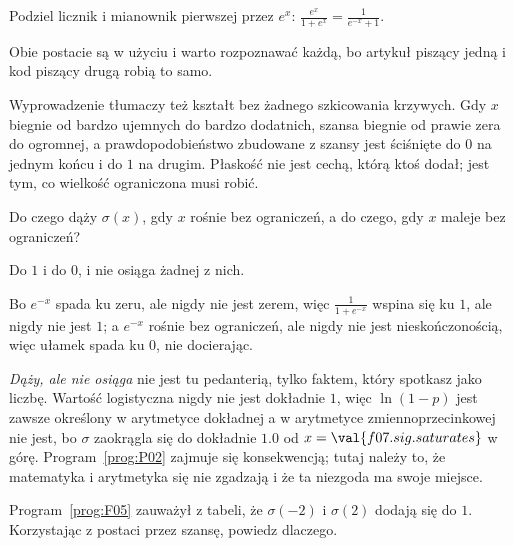 \begin{fr}
\begin{ansblock}
Podziel licznik i mianownik pierwszej przez $e^{x}$:
$\frac{e^{x}}{1 + e^{x}} = \frac{1}{e^{-x} + 1}$.
\end{ansblock}

Obie postacie są w użyciu i warto rozpoznawać każdą, bo artykuł piszący jedną
i kod piszący drugą robią to samo.

Wyprowadzenie tłumaczy też kształt bez żadnego szkicowania krzywych. Gdy $x$
biegnie od bardzo ujemnych do bardzo dodatnich, szansa biegnie od prawie zera
do ogromnej, a prawdopodobieństwo zbudowane z szansy jest ściśnięte do $0$ na
jednym końcu i do $1$ na drugim. Płaskość nie jest cechą, którą ktoś dodał;
jest tym, co wielkość ograniczona musi robić.

Do czego dąży $\sigma(x)$, gdy $x$ rośnie bez ograniczeń, a do czego, gdy $x$
maleje bez ograniczeń?
\nextframe
\end{fr}

\begin{fr}
\begin{ansblock}
Do $1$ i do $0$, i nie osiąga żadnej z nich.
\end{ansblock}

Bo $e^{-x}$ spada ku zeru, ale nigdy nie jest zerem, więc
$\frac{1}{1+e^{-x}}$ wspina się ku $1$, ale nigdy nie jest $1$; a $e^{-x}$
rośnie bez ograniczeń, ale nigdy nie jest nieskończonością, więc ułamek spada
ku $0$, nie docierając.

\begin{note}
\emph{Dąży, ale nie osiąga} nie jest tu pedanterią, tylko faktem, który
spotkasz jako liczbę. Wartość logistyczna nigdy nie jest dokładnie $1$, więc
$\ln(1 - p)$ jest zawsze określony w arytmetyce dokładnej \dash{} a w
arytmetyce zmiennoprzecinkowej nie jest, bo $\sigma$ zaokrągla się do
dokładnie $\num{1.0}$ od $x = \val{f07.sig.saturates}$ w górę. Program~\ref{prog:P02}
zajmuje się konsekwencją; tutaj należy to, że matematyka i arytmetyka się nie
zgadzają i że ta niezgoda ma swoje miejsce.
\end{note}

Program~\ref{prog:F05} zauważył z tabeli, że $\sigma(-2)$ i $\sigma(2)$ dodają
się do $1$. Korzystając z postaci przez szansę, powiedz dlaczego.
\nextframe
\end{fr}

